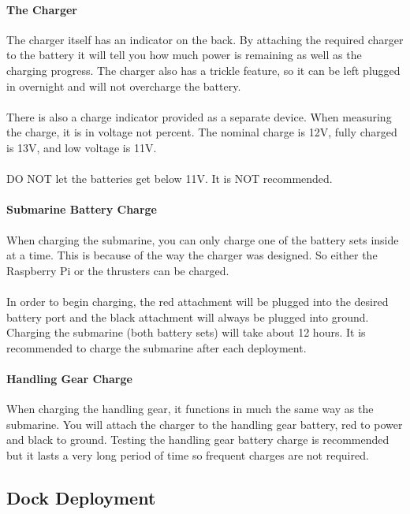 \documentclass[
18pt, %
a4paper, %
oneside, %
headinclude,footinclude, %
]{scrartcl}
\begin{document}
\paragraph{The Charger}
The charger itself has an indicator on the back. By attaching the required charger to the battery it will tell you how much power is remaining as well as the charging progress. The charger also has a trickle feature, so it can be left plugged in overnight and will not overcharge the battery.\\ \\
There is also a charge indicator provided as a separate device. When measuring the charge, it is in voltage not percent. The nominal charge is 12V, fully charged is 13V, and low voltage is 11V. \\ \\
DO NOT let the batteries get below 11V. It is NOT recommended.

\paragraph{Submarine Battery Charge}
When charging the submarine, you can only charge one of the battery sets inside at a time. This is because of the way the charger was designed. So either the Raspberry Pi or the thrusters can be charged. \\ \\
In order to begin charging, the red attachment will be plugged into the desired battery port and the black attachment will always be plugged into ground. Charging the submarine (both battery sets) will take about 12 hours. It is recommended to charge the submarine after each deployment.

\paragraph{Handling Gear Charge}
When charging the handling gear, it functions in much the same way as the submarine. You will attach the charger to the handling gear battery, red to power and black to ground. Testing the handling gear battery charge is recommended but it lasts a very long period of time so frequent charges are not required.


\subsection{Dock Deployment}
\end{document}
